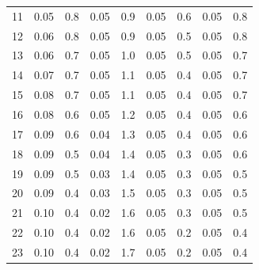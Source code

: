 \documentclass{article}
\begin{document}
{\begin{appendix}
\begin{table}[H]
\begin{tabular}{c|cc||cc||cc||cc}
11 & 0.05             & 0.8              & 0.05              & 0.9               & 0.05               & 0.6               & 0.05              & 0.8               \\
12 & 0.06             & 0.8              & 0.05              & 0.9               & 0.05               & 0.5               & 0.05              & 0.8               \\
13 & 0.06             & 0.7              & 0.05              & 1.0               & 0.05               & 0.5               & 0.05              & 0.7               \\
14 & 0.07             & 0.7              & 0.05              & 1.1               & 0.05               & 0.4               & 0.05              & 0.7               \\
15 & 0.08             & 0.7              & 0.05              & 1.1               & 0.05               & 0.4               & 0.05              & 0.7               \\
16 & 0.08             & 0.6              & 0.05              & 1.2               & 0.05               & 0.4               & 0.05              & 0.6               \\
17 & 0.09             & 0.6              & 0.04              & 1.3               & 0.05               & 0.4               & 0.05              & 0.6               \\
18 & 0.09             & 0.5              & 0.04              & 1.4               & 0.05               & 0.3               & 0.05              & 0.6               \\
19 & 0.09             & 0.5              & 0.03              & 1.4               & 0.05               & 0.3               & 0.05              & 0.5               \\
20 & 0.09             & 0.4              & 0.03              & 1.5               & 0.05               & 0.3               & 0.05              & 0.5               \\
21 & 0.10             & 0.4              & 0.02              & 1.6               & 0.05               & 0.3               & 0.05              & 0.5               \\
22 & 0.10             & 0.4              & 0.02              & 1.6               & 0.05               & 0.2               & 0.05              & 0.4               \\
23 & 0.10             & 0.4              & 0.02              & 1.7               & 0.05               & 0.2               & 0.05              & 0.4               \\

\end{tabular}
\end{table}
\end{appendix}}
\end{document}
